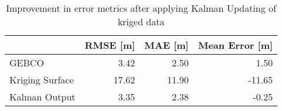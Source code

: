 \begin{table}
\centering
\caption{Improvement in error metrics after applying Kalman Updating of kriged data}
\label{tab:oahu5_gebco_raster_error}
\begin{tabular}{lrrr}
\toprule
 & RMSE [m] & MAE [m] & Mean Error [m] \\
\midrule
GEBCO & 3.42 & 2.50 & 1.50 \\
Kriging Surface & 17.62 & 11.90 & -11.65 \\
Kalman Output & 3.35 & 2.38 & -0.25 \\
\bottomrule
\end{tabular}
\end{table}

